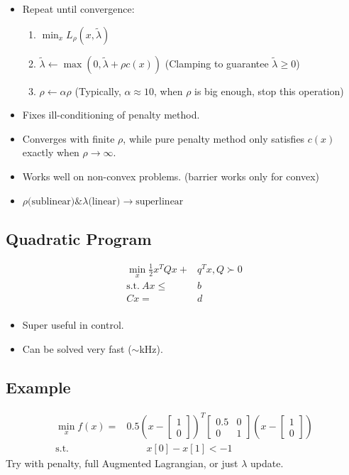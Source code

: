 \begin{itemize}
    \item Repeat until convergence:
    \begin{enumerate}
        \item $\min_x L_\rho(x,\tilde{\lambda})$
        \item $\tilde{\lambda}\gets \max(0,\tilde{\lambda}+\rho c\left( x \right))$ (Clamping to guarantee $\tilde{\lambda}\ge0$)
        \item $\rho\gets\alpha\rho$ (Typically, $\alpha\approx10$, when $\rho$ is big enough, stop this operation)
    \end{enumerate}
    \item Fixes ill-conditioning of penalty method.
    \item Converges with finite $\rho$, while pure penalty method only satisfies $c(x)$ exactly when $\rho\to\infty$.
    \item Works well on non-convex problems. (barrier works only for convex)
    \item $\rho\text{(sublinear)} \& \lambda\text{(linear)} \to \text{superlinear}$
\end{itemize}

\subsection{Quadratic Program}
\begin{equation}
    \begin{aligned}
        \min_x\frac{1}{2}x^TQx+&q^Tx,Q\succ 0\\
        \text{s.t.}\ Ax\le& b\\
        Cx=&d\\
    \end{aligned}
\end{equation}
\begin{itemize}
    \item Super useful in control.
    \item Can be solved very fast ($\sim$kHz).
\end{itemize}
\subsection{Example}
\begin{equation}
    \begin{aligned}
        \min_x f(x) =& 0.5  \left(x-\begin{bmatrix}
            1\\0
        \end{bmatrix}\right)^T\begin{bmatrix}
            0.5&0\\0&1
        \end{bmatrix}\left(x-\begin{bmatrix}
            1\\0
        \end{bmatrix}\right) \\
    \text{s.t.}& \qquad x[0] - x[1] < -1
    \end{aligned} 
\end{equation}
Try with penalty, full Augmented Lagrangian, or just $\lambda$ update.

